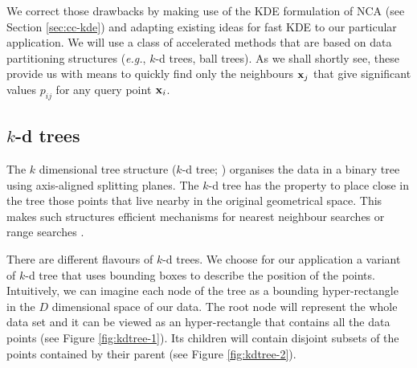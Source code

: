 We correct those drawbacks by making use of the KDE formulation of NCA (see Section \ref{sec:cc-kde}) and adapting existing ideas for fast KDE \citep{deng1995,gray2003} to our particular application. We will use a class of accelerated methods that are based on data partitioning structures (\textit{e.g.}, $k$-d trees, ball trees). As we shall shortly see, these provide us with means to quickly find only the neighbours $\mathbf{x}_j$ that give significant values $p_{ij}$ for any query point $\mathbf{x}_i$. 
%

\subsection{$k$-d trees}
\label{subsec:k-d-trees}

The $k$ dimensional tree structure ($k$-d tree; \citealp{bentley1975}) organises the data in a binary tree using axis-aligned splitting planes. The $k$-d tree has the property to place close in the tree those points that live nearby in the original geometrical space. This makes such structures efficient mechanisms for nearest neighbour searches \citep{friedman1977} or range searches \citep{moore1991}.

There are different flavours of $k$-d trees. We choose for our application a variant of $k$-d tree that uses bounding boxes to describe the position of the points. Intuitively, we can imagine each node of the tree as a bounding hyper-rectangle in the $D$ dimensional space of our data. The root node will represent the whole data set and it can be viewed as an hyper-rectangle that contains all the data points (see Figure \ref{fig:kdtree-1}). Its children will contain disjoint subsets of the points contained by their parent (see Figure \ref{fig:kdtree-2}).

